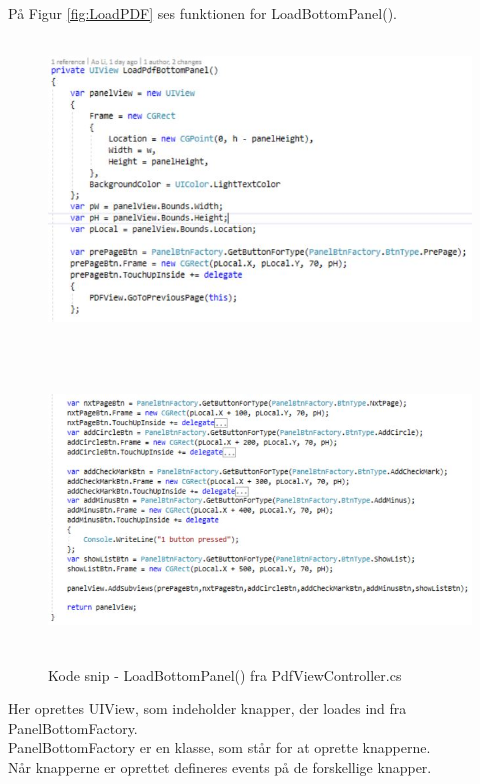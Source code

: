 På Figur \ref{fig:LoadPDF} ses funktionen for LoadBottomPanel().
\begin{figure}[H] %
	\centering
	\includegraphics[height=8cm, width=15cm]{../ArkitekturDesign/Design/RegisterPDF/LoadBtnPanel1}
\end{figure}
\begin{figure}[H] %
	\centering
	\includegraphics[height=8cm, width=15cm]{../ArkitekturDesign/Design/RegisterPDF/LoadBtnPanel2}
	\caption{Kode snip - LoadBottomPanel() fra PdfViewController.cs}
	\label{fig:LoadBtnPanel2}
\end{figure}
Her oprettes UIView, som indeholder knapper, der loades ind fra PanelBottomFactory. \\
PanelBottomFactory er en klasse, som står for at oprette knapperne. \\
Når knapperne er oprettet defineres events på de forskellige knapper. \\

\clearpage

